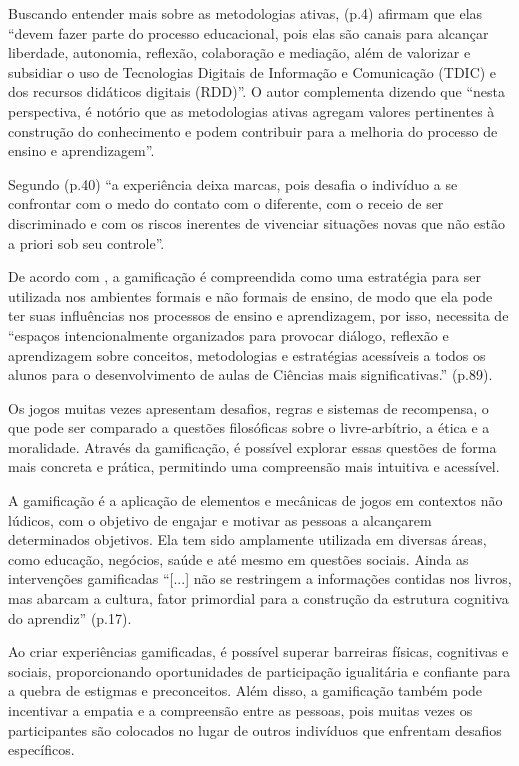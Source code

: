 Buscando entender mais sobre as metodologias ativas,  (p.4) afirmam que elas ``devem fazer parte do processo educacional, pois elas são canais para alcançar liberdade, autonomia, reflexão, colaboração e mediação, além de valorizar e subsidiar o uso de Tecnologias Digitais de Informação e Comunicação (TDIC) e dos recursos didáticos digitais (RDD)''. O autor complementa dizendo que ``nesta perspectiva, é notório que as metodologias ativas agregam valores pertinentes à construção do conhecimento e podem contribuir para a melhoria do processo de ensino e aprendizagem''.

Segundo  (p.40) ``a experiência deixa marcas, pois desafia o indivíduo a se confrontar com o medo do contato com o diferente, com o receio de ser discriminado e com os riscos inerentes de vivenciar situações novas que não estão a priori sob seu controle''.

De acordo com , a gamificação é compreendida como uma estratégia para ser utilizada nos ambientes formais e não formais de ensino, de modo que ela pode ter suas influências nos processos de ensino e aprendizagem, por isso, necessita de ``espaços intencionalmente organizados para provocar diálogo, reflexão e aprendizagem sobre conceitos, metodologias e estratégias acessíveis a todos os alunos para o desenvolvimento de aulas de Ciências mais significativas.'' \cite{SILVA2019} (p.89).

Os jogos muitas vezes apresentam desafios, regras e sistemas de recompensa, o que pode ser comparado a questões filosóficas sobre o livre-arbítrio, a ética e a moralidade. Através da gamificação, é possível explorar essas questões de forma mais concreta e prática, permitindo uma compreensão mais intuitiva e acessível.

A gamificação é a aplicação de elementos e mecânicas de jogos em contextos não lúdicos, com o objetivo de engajar e motivar as pessoas a alcançarem determinados objetivos. Ela tem sido amplamente utilizada em diversas áreas, como educação, negócios, saúde e até mesmo em questões sociais. Ainda as intervenções gamificadas ``[...] não se restringem a informações contidas nos livros, mas abarcam a cultura, fator primordial para a construção da estrutura cognitiva do aprendiz'' \cite{SILVA-PIRES2020} (p.17).

Ao criar experiências gamificadas, é possível superar barreiras físicas, cognitivas e sociais, proporcionando oportunidades de participação igualitária e confiante para a quebra de estigmas e preconceitos. Além disso, a gamificação também pode incentivar a empatia e a compreensão entre as pessoas, pois muitas vezes os participantes são colocados no lugar de outros indivíduos que enfrentam desafios específicos.

